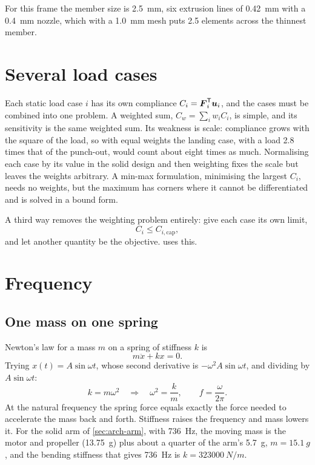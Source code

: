 For this frame the member size is \SI{2.5}{mm}, six extrusion lines of \SI{0.42}{mm} with a \SI{0.4}{mm} nozzle, which with a \SI{1.0}{mm} mesh puts 2.5 elements across the thinnest member.

\section{Several load cases}\label{sec:to-loadcases}

Each static load case $i$ has its own compliance $C_i = \boldsymbol{F}_i^{\mathsf{T}}\boldsymbol{u}_i$, and the cases must be combined into one problem. A weighted sum, $C_w = \sum_i w_i C_i$, is simple, and its sensitivity is the same weighted sum. Its weakness is scale: compliance grows with the square of the load, so with equal weights the landing case, with a load 2.8 times that of the punch-out, would count about eight times as much. Normalising each case by its value in the solid design and then weighting fixes the scale but leaves the weights arbitrary. A min-max formulation, minimising the largest $C_i$, needs no weights, but the maximum has corners where it cannot be differentiated and is solved in a bound form.

A third way removes the weighting problem entirely: give each case its own limit,
\begin{equation}
C_i \leq C_{i,\text{cap}},
\end{equation}
and let another quantity be the objective.  uses this.

\section{Frequency}\label{sec:to-frequency}

\subsection{One mass on one spring}

Newton's law for a mass $m$ on a spring of stiffness $k$ is
\begin{equation}
m\ddot{x} + kx = 0.
\end{equation}
Trying $x(t) = A\sin\omega t$, whose second derivative is $-\omega^2 A\sin\omega t$, and dividing by $A\sin\omega t$:
\begin{equation}
k = m\omega^2 \quad\Rightarrow\quad \omega^2 = \frac{k}{m}, \qquad f = \frac{\omega}{2\pi}.
\end{equation}
At the natural frequency the spring force equals exactly the force needed to accelerate the mass back and forth. Stiffness raises the frequency and mass lowers it. For the solid arm of \cref{sec:arch-arm}, with \SI{736}{Hz}, the moving mass is the motor and propeller (\SI{13.75}{g}) plus about a quarter of the arm's \SI{5.7}{g}, $m = \SI{15.1}{g}$, and the bending stiffness that gives \SI{736}{Hz} is $k = \SI{323000}{N/m}$.

